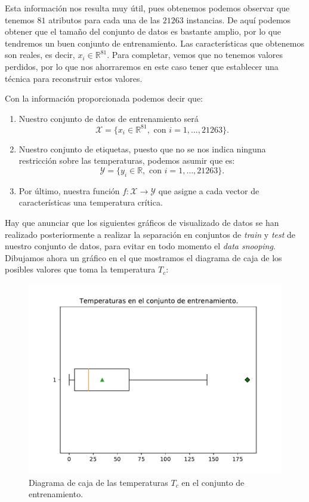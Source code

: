 \documentclass[a4paper, 20pt]{article}
\newcommand{\R}{\mathbb R}
\begin{document}
Esta información nos resulta muy útil, pues obtenemos podemos observar que tenemos $81$ atributos para cada una de las $21263$ instancias. De aquí podemos obtener que el tamaño del conjunto de datos es bastante amplio, por lo que tendremos un buen conjunto de entrenamiento. Las características que obtenemos son reales, es decir, $x_i \in \mathbb R^{81}$. Para completar, vemos que no tenemos valores perdidos, por lo que nos ahorraremos en este caso tener que establecer una técnica para reconstruir estos valores.

Con la información proporcionada podemos decir que:

\begin{enumerate}
\item Nuestro conjunto de datos de entrenamiento será
  $$\mathcal X = \{ x_i \in \R^{81}, \text{ con } i = 1, \dots , 21263 \}.$$

\item Nuestro conjunto de etiquetas, puesto que no se nos indica ninguna restricción sobre las temperaturas, podemos asumir que es:
  $$
  \mathcal Y = \{ y_i \in \R, \text { con } i = 1,\dots,21263\}.
  $$

\item Por último, nuestra función $f : \mathcal X \to \mathcal Y$ que asigne a cada vector de características una temperatura crítica.
  
\end{enumerate}

Hay que anunciar que los siguientes gráficos de visualizado de datos se han realizado posteriormente a realizar la separación en conjuntos de \emph{train} y \emph{test} de nuestro conjunto de datos, para evitar en todo momento el \emph{data snooping}.\\

Dibujamos ahora un gráfico en el que mostramos el diagrama de caja de los posibles valores que toma la temperatura $T_c$:

\begin{figure}[H]
  \centering
  \includegraphics[scale = 0.4]{boxplot_y.pdf}
  \caption{Diagrama de caja de las temperaturas $T_c$ en el conjunto de entrenamiento.}
\end{figure}
\end{document}
